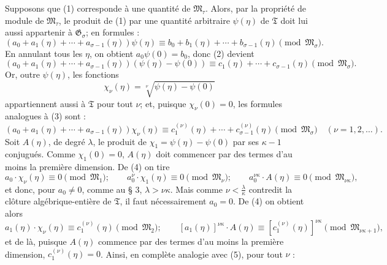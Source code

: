 Supposons que (1) corresponde à une quantité de $\mathfrak M_\tau$. Alors, par la propriété de module de $\mathfrak M_\tau$, le produit de (1) par une quantité arbitraire $\psi(\eta)$ de $\mathfrak T$ doit lui aussi appartenir à $\mathfrak G_\sigma$; en formules :
\begin{equation}
(a_0+a_1(\eta)+\cdots+a_{\sigma-1}(\eta))\psi(\eta)
\equiv b_0+b_1(\eta)+\cdots+b_{\sigma-1}(\eta)
\pmod{\mathfrak M_\sigma}.
\tag{2}
\end{equation}
En annulant tous les $\eta$, on obtient $a_0\psi(0)=b_0$, donc (2) devient
\begin{equation}
(a_0+a_1(\eta)+\cdots+a_{\sigma-1}(\eta))(\psi(\eta)-\psi(0))
\equiv c_1(\eta)+\cdots+c_{\sigma-1}(\eta)
\pmod{\mathfrak M_\sigma}.
\tag{3}
\end{equation}
Or, outre $\psi(\eta)$, les fonctions
\[
 \chi_\nu(\eta)=\sqrt[\nu]{\psi(\eta)-\psi(0)}
\]
appartiennent aussi à $\mathfrak T$ pour tout $\nu$; et, puisque $\chi_\nu(0)=0$, les formules analogues à (3) sont :
\begin{equation}
(a_0+a_1(\eta)+\cdots+a_{\sigma-1}(\eta))\chi_\nu(\eta)
\equiv c_1^{(\nu)}(\eta)+\cdots+c_{\sigma-1}^{(\nu)}(\eta)
\pmod{\mathfrak M_\sigma}
\quad(\nu=1,2,\ldots).
\tag{4}
\end{equation}
Soit $A(\eta)$, de degré $\lambda$, le produit de $\chi_1=\psi(\eta)-\psi(0)$ par ses $\kappa-1$ conjugués. Comme $\chi_1(0)=0$, $A(\eta)$ doit commencer par des termes d'au moins la première dimension. De (4) on tire
\begin{equation}
a_0\cdot\chi_\nu(\eta)\equiv0\pmod{\mathfrak M_1};\qquad
a_0^\nu\cdot\chi_1(\eta)\equiv0\pmod{\mathfrak M_\nu};\qquad
a_0^{\nu\kappa}\cdot A(\eta)\equiv0\pmod{\mathfrak M_{\nu\kappa}},
\tag{5}
\end{equation}
et donc, pour $a_0\ne0$, comme au \S{} 3, $\lambda>\nu\kappa$. Mais comme $\nu<\frac{\lambda}{\kappa}$ contredit la clôture algébrique-entière de $\mathfrak T$, il faut nécessairement $a_0=0$. De (4) on obtient alors
\begin{equation}
a_1(\eta)\cdot\chi_\nu(\eta)\equiv c_1^{(\nu)}(\eta)\pmod{\mathfrak M_2};\qquad
[a_1(\eta)]^{\nu\kappa}\cdot A(\eta)
\equiv[c_1^{(\nu)}(\eta)]^{\nu\kappa}\pmod{\mathfrak M_{\nu\kappa+1}},
\tag{6}
\end{equation}
et de là, puisque $A(\eta)$ commence par des termes d'au moins la première dimension, $c_1^{(\nu)}(\eta)=0$. Ainsi, en complète analogie avec (5), pour tout $\nu$ :
